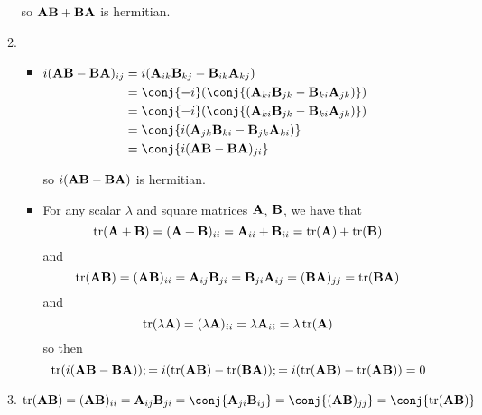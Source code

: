 \documentclass[fleqn,a4paper,11pt]{article}
\begin{document}
\begin{enumerate}[label=\textbf{\arabic*.}]
\begin{enumerate}[label=(\roman*)]
     so \(\mathbf{A}\mathbf{B} + \mathbf{B}\mathbf{A}\) is hermitian.
    \item
     \begin{itemize}
      \item \(
       \begin{aligned}[t]
        i(\mat A\mat B - \mat B\mat A)_{ij}
         &= i(\mat A_{ik} \mat B_{kj} - \mat B_{ik} \mat A_{kj}) \\
         &= \conj{-i}(\conj{(\mat A_{ki} \mat B_{jk}
           - \mat B_{ki} \mat A_{jk})}) \\
         &= \conj{-i}(\conj{(\mat A_{ki} \mat B_{jk}
           - \mat B_{ki} \mat A_{jk})}) \\
         &= \conj{i(\mat A_{jk} \mat B_{ki} - \mat B_{jk} \mat A_{ki})} \\
         &= \conj{i(\mat A\mat B - \mat B\mat A)_{ji}}
       \end{aligned}\)

       so \(i(\mathbf{A}\mathbf{B} - \mathbf{B}\mathbf{A})\) is hermitian.
      \item
       For any scalar \(\lambda\) and square matrices \(\mathbf{A}\), \(\mathbf{B}\), we
       have that
       \begin{equation*}
        \operatorname{tr}(\mathbf{A} + \mathbf{B})
         = (\mathbf{A} + \mathbf{B})_{ii}
         = \mathbf{A}_{ii} + \mathbf{B}_{ii}
         = \operatorname{tr}(\mathbf{A}) + \operatorname{tr}(\mathbf{B})
       \end{equation*}
       and
       \begin{equation*}
        \operatorname{tr}(\mathbf{A}\mathbf{B})
        = (\mathbf{A}\mathbf{B})_{ii}
        = \mathbf{A}_{ij} \mathbf{B}_{ji}
        = \mathbf{B}_{ji} \mathbf{A}_{ij}
        = (\mathbf{B}\mathbf{A})_{jj}
         = \operatorname{tr}(\mathbf{B}\mathbf{A})
       \end{equation*}
       and
       \begin{equation*}
        \operatorname{tr}(\lambda \mathbf{A})
        = (\lambda \mathbf{A})_{ii}
        = \lambda \mathbf{A}_{ii}
        = \lambda \operatorname{tr}(\mathbf{A})
       \end{equation*}
       so then
       \begin{equation*}
        \operatorname{tr}(i(\mathbf{A}\mathbf{B} - \mathbf{B}\mathbf{A}));
        = i(\operatorname{tr}(\mathbf{A}\mathbf{B}) - \operatorname{tr}(\mathbf{B}\mathbf{A}));
        = i(\operatorname{tr}(\mathbf{A}\mathbf{B}) - \operatorname{tr}(\mathbf{A}\mathbf{B})) = 0
       \end{equation*}
     \end{itemize}
    \item \(
      \tr(\mat A\mat B)
      = (\mat A\mat B)_{ii}
      = \mat A_{ij} \mat B_{ji}
      = \conj{\mat A_{ji} \mat B_{ij}}
      = \conj{(\mat A\mat B)_{jj}} = \conj{\tr(\mat A\mat B)}
      \)


\end{enumerate}
\end{enumerate}
\end{document}

